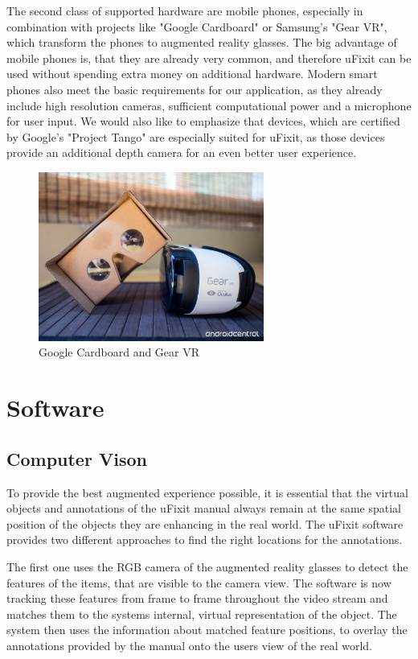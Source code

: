 The second class of supported hardware are mobile phones, especially in combination with projects like "Google Cardboard" or Samsung's "Gear VR", which transform the phones to augmented reality glasses. The big advantage of mobile phones is, that they are already very common, and therefore uFixit can be used  without spending extra money on additional hardware. Modern smart phones also meet the basic requirements for our application, as they already include high resolution cameras, sufficient computational power and a microphone for user input. We would also like to emphasize that devices, which are certified by Google's "Project Tango" are especially suited for uFixit, as those devices provide an additional depth camera for an even better user experience.
\begin{figure}[H]
		\includegraphics[width=0.66\textwidth]{../images/googleCarboard.jpg}
		\centering
		\caption{Google Cardboard and Gear VR}
		\label{fig:cardBoard}
\end{figure}
				

\section{Software}
\subsection{Computer Vison}
To provide the best augmented experience possible, it is essential that the virtual objects and annotations of the uFixit manual always remain at the same spatial position of the objects they are enhancing in the real world. The uFixit software provides two different approaches to find the right locations for the annotations.

The first one uses the RGB camera of the augmented reality glasses to detect the features of the items, that are visible to the camera view. The software is now tracking these features from frame to frame throughout the video stream and matches them to the systems internal,  virtual representation of the object. The system then uses the information about matched feature positions, to overlay the annotations provided by the manual onto the users view of the real world.

